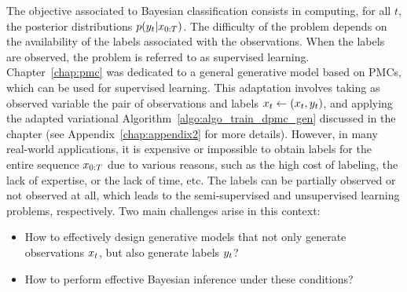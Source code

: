 The objective associated to Bayesian classification 
consists in computing, for all $t$,
the posterior distributions  $p(y_t|x_{0:T})$. %
The difficulty of the problem depends on the availability of the labels
associated with the observations. When the labels are observed, the problem is
referred to as supervised learning.
Chapter~\ref{chap:pmc} 
 was dedicated to a general
generative model based on PMCs, which can be used for 
supervised learning. This adaptation involves taking as observed variable the
pair of observations and labels $x_t \leftarrow (x_t, y_t)$, and
applying the adapted variational Algorithm~\ref{algo:algo_train_dpmc_gen} 
 discussed in the chapter (see Appendix~\ref{chap:appendix2} for more details). 
However, in many real-world applications, it is expensive or impossible to obtain
labels for the entire sequence $x_{0:T}$
due to various reasons, such as the high cost of labeling,
the lack of expertise, or the lack of time, etc.
The labels can be partially observed or not observed at all,
which leads to the semi-supervised and unsupervised learning problems, 
respectively.
Two main challenges arise in this context:
\begin{itemize}
    \item How to effectively design generative models that
not only generate  observations $x_t$, but also generate labels $y_t$? 
\item How to perform effective Bayesian inference under 
these  conditions?
\end{itemize}


